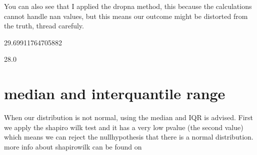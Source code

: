 \documentclass[letterpaper,10pt,english]{jupyterBook}
\begin{document}
\sphinxAtStartPar
You can also see that I applied the dropna method, this because the calculations cannot handle nan values, but this means our outcome might be distorted from the truth, thread carefuly.

\begin{sphinxVerbatim}[commandchars=\\\{\}]
 
\end{sphinxVerbatim}

\begin{sphinxVerbatim}[commandchars=\\\{\}]
\PYG{p}{[}\PYG{p}{]}
\end{sphinxVerbatim}

\begin{sphinxVerbatim}[commandchars=\\\{\}]
29.69911764705882
\end{sphinxVerbatim}

\begin{sphinxVerbatim}[commandchars=\\\{\}]
\PYG{p}{[}\PYG{p}{]}
\end{sphinxVerbatim}

\begin{sphinxVerbatim}[commandchars=\\\{\}]
28.0
\end{sphinxVerbatim}


\section{median and interquantile range}
\label{\detokenize{c5_data_exploration/variable_identification:median-and-interquantile-range}}
\sphinxAtStartPar
When our distribution is not normal, using the median and IQR is advised.
First we apply the shapiro wilk test and it has a very low p\sphinxhyphen{}value (the second value) which means we can reject the null\sphinxhyphen{}hypothesis that there is a normal distribution. more info about shapiro\sphinxhyphen{}wilk can be found on 
\end{document}

